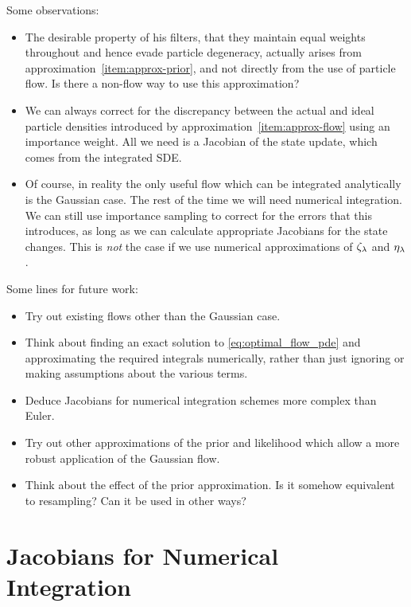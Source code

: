 \documentclass{article}
\begin{document}
Some observations:
%
\begin{itemize}
  \item The desirable property of his filters, that they maintain equal weights throughout and hence evade particle degeneracy, actually arises from approximation~\ref{item:approx-prior}, and not directly from the use of particle flow. Is there a non-flow way to use this approximation?
  \item We can always correct for the discrepancy between the actual and ideal particle densities introduced by approximation~\ref{item:approx-flow} using an importance weight. All we need is a Jacobian of the state update, which comes from the integrated SDE.
  \item Of course, in reality the only useful flow which can be integrated analytically is the Gaussian case. The rest of the time we will need numerical integration. We can still use importance sampling to correct for the errors that this introduces, as long as we can calculate appropriate Jacobians for the state changes. This is \emph{not} the case if we use numerical approximations of $\zeta_{\lambda}$ and $\eta_{\lambda}$.
\end{itemize}

Some lines for future work:
%
\begin{itemize}
  \item Try out existing flows other than the Gaussian case.
  \item Think about finding an exact solution to \eqref{eq:optimal_flow_pde} and approximating the required integrals numerically, rather than just ignoring or making assumptions about the various terms.
  \item Deduce Jacobians for numerical integration schemes more complex than Euler.
  \item Try out other approximations of the prior and likelihood which allow a more robust application of the Gaussian flow.
  \item Think about the effect of the prior approximation. Is it somehow equivalent to resampling? Can it be used in other ways?
\end{itemize}



\section{Jacobians for Numerical Integration}
\end{document}
